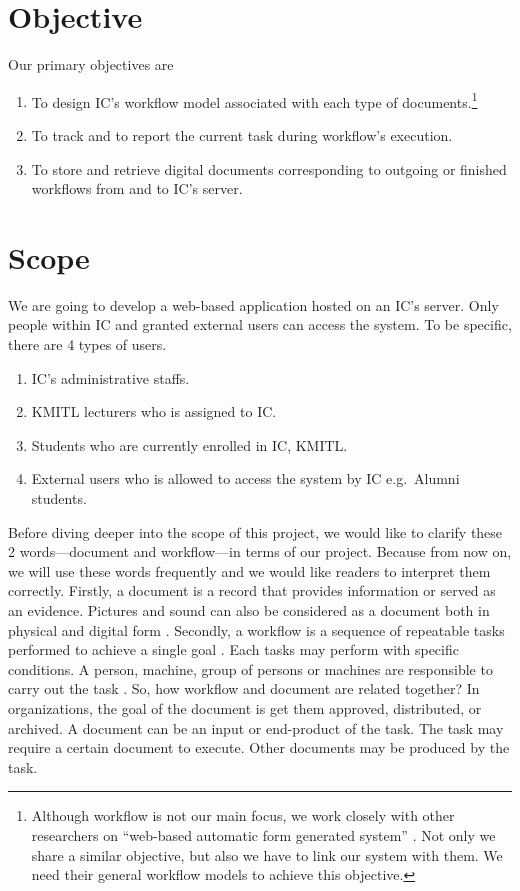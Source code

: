 \section{Objective}
Our primary objectives are
\begin{enumerate}
\item To design IC's workflow model associated with each type of documents.\footnote{
	Although workflow is not our main focus, we work closely with other researchers on ``web-based automatic form generated system'' \cite{web-based-form}.
	Not only we share a similar objective, but also we have to link our system with them.
	We need their general workflow models to achieve this objective.
	}
\item To track and to report the current task during workflow's execution.
\item To store and retrieve digital documents corresponding to outgoing or finished workflows from and to IC's server.
\end{enumerate}

\section{Scope}
We are going to develop a web-based application hosted on an IC's server.
Only people within IC and granted external users can access the system.
To be specific, there are 4 types of users.
\begin{enumerate}
\item IC's administrative staffs.
\item KMITL lecturers who is assigned to IC.
\item Students who are currently enrolled in IC, KMITL.
\item External users who is allowed to access the system by IC e.g.\ Alumni students.
\end{enumerate}

Before diving deeper into the scope of this project, we would like to clarify these 2 words---document and workflow---in terms of our project. %
Because from now on, we will use these words frequently and we would like readers to interpret them correctly.
Firstly, a document is a record that provides information or served as an evidence. 
Pictures and sound can also be considered as a document both in physical and digital form \cite{oxdict:document,whatis:document}. 
Secondly, a workflow is a sequence of repeatable tasks performed to achieve a single goal \cite{Jablonski:1996:WMM}. 
Each tasks may perform with specific conditions.
A person, machine, group of persons or machines are responsible to carry out the task \cite{wfMangement}. 
So, how workflow and document are related together?
In organizations, the goal of the document is get them approved, distributed, or archived.
A document can be an input or end-product of the task.
The task may require a certain document to execute.
Other documents may be produced by the task.

